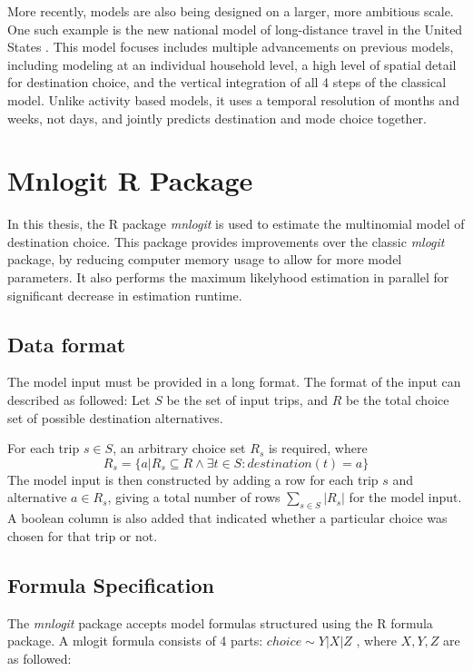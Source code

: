 More recently, models are also being designed on a larger, more ambitious scale. One such example is the new national model of long-distance travel in the United States \parencite{Outwater15}. This model focuses includes multiple advancements on previous models, including modeling at an individual household level, a high level of spatial detail for destination choice, and the vertical integration of all 4 steps of the classical model. Unlike activity based models, it uses a temporal resolution of months and weeks, not days, and jointly predicts destination and mode choice together. 

\section{Mnlogit R Package}
\label{section:mnlogit-structure}
\label{section:mnlogit}
In this thesis, the R package \textit{mnlogit} \parencite{hasan2014fast} is used to estimate the multinomial model of destination choice. This package provides improvements over the classic \textit{mlogit} package, by reducing computer memory usage to allow for more model parameters. It also performs the maximum likelyhood estimation in parallel for significant decrease in estimation runtime.
\subsection{Data format}
The model input must be provided in a long format. The format of the input can described as followed:
Let \(S\)  be the set of input trips, and \(R\)  be the total choice set of possible destination alternatives. 

For each trip $s \in S$, an arbitrary choice set $R_s$ is required, where
$$ R_s  =  \{a | R_s \subseteq R \wedge \exists t \in S : destination(t) = a \} $$ 
The model input is then constructed by adding a row for each trip $s$ and alternative $a \in R_s$, giving a total number of rows  $ \sum_{s \in S} |R_s| $  for the model input. A boolean column is also added that indicated whether a particular choice was chosen for that trip or not.

\subsection{Formula Specification}
The \textit{mnlogit} package accepts model formulas structured using the R formula package. A mlogit formula consists of 4 parts: $ choice \sim Y | X | Z $ , where $X,Y,Z$ are as followed:

